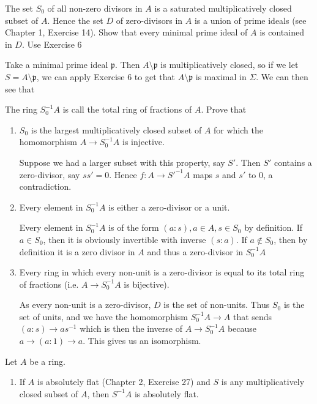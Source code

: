 \begin{questions}
\question The set $S_{0} $ of all non-zero divisors in $A $ is a saturated multiplicatively closed subset of $A $. Hence the set $D $ of zero-divisors in $A $ is a union of prime ideals (see Chapter 1, Exercise 14). Show that every minimal prime ideal of $A $ is contained in $D $.
\ifhint
	Use Exercise 6
\fi
\begin{solution}
	Take a minimal prime ideal $\mathfrak{p} $.
	Then $A \setminus \mathfrak{p} $ is multiplicatively closed, so if we let $S = A \setminus \mathfrak{p} $, we can apply Exercise 6 to get that $A\setminus \mathfrak{p} $ is maximal in $\Sigma $.
	We can then see that 
\end{solution}
The ring $S_{0}^{-1}A $ is call the total ring of fractions of $A $. Prove that
\begin{enumerate}
\item $S_{0} $ is the largest multiplicatively closed subset of $A $ for which the homomorphism $A\to S_{0}^{-1}A $ is injective.
	\begin{solution}
		Suppose we had a larger subset with this property, say $S' $.
		Then $S' $ contains a zero-divisor, say $ss' = 0 $.
		Hence $f:A\to S'^{-1}A $ maps $s $ and $s' $ to $0 $, a contradiction.
	\end{solution}
\item Every element in $S_{0}^{-1}A $ is either a zero-divisor or a unit.
	\begin{solution}
		Every element in $S_{0}^{-1}A $ is of the form $(a:s), a\in A, s\in S_{0}$ by definition.
		If $a\in S_{0} $, then it is obviously invertible with inverse $(s:a) $.
		If $a\not\in S_{0} $, then by definition it is a zero divisor in $A $ and thus a zero-divisor in $S_{0}^{-1}A $
	\end{solution}
\item Every ring in which every non-unit is a zero-divisor is equal to its total ring of fractions (i.e. $A\to S_{0}^{-1}A $ is bijective).
	\begin{solution}
		As every non-unit is a zero-divisor, $D $ is the set of non-units.
		Thus $S_{0} $ is the set of units, and we have the homomorphism $S_{0}^{-1}A \to A $ that sends $(a:s) \to as^{-1} $ which is then the inverse of $A\to S_{0}^{-1}A $ because $a \to (a:1) \to a $.
		This gives us an isomorphism.
	\end{solution}
\end{enumerate}
\question Let $A $ be a ring.
\begin{enumerate}
	\item If $A $ is absolutely flat (Chapter 2, Exercise 27) and $S $ is any multiplicatively closed subset of $A $, then $S^{-1}A $ is absolutely flat.

\end{enumerate}
\end{questions}
